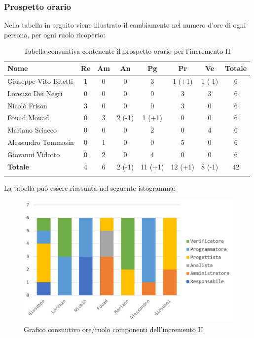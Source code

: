 		\subsubsection{Prospetto orario}
			Nella tabella in seguito viene illustrato il cambiamento nel numero d'ore di ogni persona, per ogni ruolo ricoperto:
			
			\begin{longtable}{|l|c|c|c|c|c|c|c|}
				\hline
				\rowcolor{lighter-grayer}
				\textbf{Nome} & \textbf{Re} & \textbf{Am} & \textbf{An} & \textbf{Pg}  & \textbf{Pr}   & \textbf{Ve} & \textbf{Totale} \\
				\hline
				\endfirsthead
				\hline
				Giuseppe Vito Bitetti  & 1 & 0 & 0 & 3 & 1 (+1) & 1 (-1) & 6\\
				\hline
				\hline
				Lorenzo Dei Negri      & 0 & 0 & 0 & 0 & 3 & 3 & 6 \\
				\hline
				\hline
				Nicolò Frison 			  & 3 & 0 & 0 & 0 & 3 & 0 & 6 \\
				\hline
				\hline
				Fouad Mouad 			& 0 & 3 & 2 (-1) & 1 (+1) & 0 & 0 & 6 \\
				\hline
				\hline
				Mariano Sciacco			 & 0 & 0 & 0 & 2 & 0 & 4 & 6 \\
				\hline
				\hline
				Alessandro Tommasin & 0 & 1 & 0 & 0 & 5 & 0 & 6 \\
				\hline
				\hline
				Giovanni Vidotto 		& 0 & 2 & 0 & 4 & 0 & 0 & 6\\
				\hline 
				\textbf{Totale} 		   & 4 &  6 & 2 (-1) & 11 (+1) & 12 (+1) & 8 (-1) & 42\\
				\hline 
				
				\caption{Tabella consuntiva contenente il prospetto orario per l'incremento II}
			\end{longtable}
			\pagebreak
			
			La tabella può essere riassunta nel seguente istogramma:
			
			\begin{figure}[H]
				\centering
				\includegraphics[width=0.8\linewidth]{images/consuntivo/ConsIncr2-1.png}
				\caption{Grafico consuntivo ore/ruolo componenti dell'incremento II}
				\label{fig:consuntivo grafico suddivione ruoli incremento II}
			\end{figure}
			
